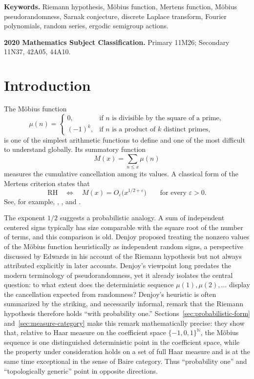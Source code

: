 \documentclass[11pt]{article}
\theoremstyle{remark}
\begin{document}
\medskip
\noindent\textbf{Keywords.}
Riemann hypothesis, M\"obius function, Mertens function, M\"obius
pseudorandomness, Sarnak conjecture, discrete Laplace transform,
Fourier polynomials, random series, ergodic semigroup actions.

\medskip
\noindent\textbf{2020 Mathematics Subject Classification.}
Primary 11M26; Secondary 11N37, 42A05, 44A10.

\section{Introduction}

The M\"obius function
\[
\mu(n)=
\begin{cases}
0,&\text{if \(n\) is divisible by the square of a prime},\\
(-1)^k,&\text{if \(n\) is a product of \(k\) distinct primes},
\end{cases}
\]
is one of the simplest arithmetic functions to define and one of the
most difficult to understand globally.  Its summatory function
\[
M(x)=\sum_{n\leq x}\mu(n)
\]
measures the cumulative cancellation among its values.  A classical
form of the Mertens criterion states that
\begin{equation}\label{eq:mertens-rh}
\mathrm{RH}
\quad\Longleftrightarrow\quad
M(x)=O_\varepsilon\bigl(x^{1/2+\varepsilon}\bigr)
\qquad\text{for every }\varepsilon>0.
\end{equation}
See, for example, \cite[Ch.~XIV]{Titchmarsh},
\cite[Ch.~6]{MontgomeryVaughan}, and \cite{Tenenbaum}.

The exponent \(1/2\) suggests a probabilistic analogy.  A sum of
independent centered signs typically has size comparable with the
square root of the number of terms, and this comparison is old.
Denjoy proposed treating the nonzero values of the M\"obius function
heuristically as independent random signs, a perspective discussed by
Edwards in his account of the Riemann hypothesis
\cite[pp.~263--266]{Edwards} but not always attributed explicitly in
later accounts.  Denjoy's viewpoint long predates the modern
terminology of pseudorandomness, yet it already isolates the central
question: to what extent does the deterministic sequence
\(\mu(1),\mu(2),\ldots\) display the cancellation expected from
randomness?  Denjoy's heuristic is often summarized by the striking,
and necessarily informal, remark that the Riemann hypothesis therefore
holds ``with probability one.''  Sections~\ref{sec:probabilistic-form}
and~\ref{sec:measure-category} make this remark mathematically
precise: they show that, relative to Haar measure on the coefficient
space \(\{-1,0,1\}^{\mathbb N}\), the M\"obius sequence is one distinguished deterministic point in the
coefficient space, while the property under consideration holds on a set
of full Haar measure and is at the same time exceptional in the sense of
Baire category.  Thus ``probability one'' and ``topologically generic''
point in opposite directions.
\end{document}
